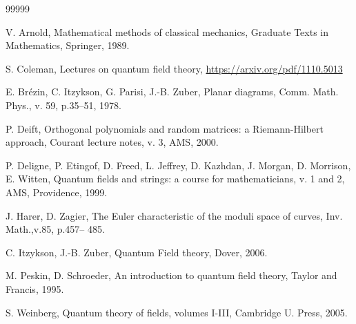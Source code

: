 \renewcommand{\refname}{参考文献}

\begin{thebibliography}{99999}

 V.  Arnold, Mathematical methods of classical mechanics, 
Graduate Texts in Mathematics, Springer, 1989. 

 S. Coleman, Lectures on quantum field theory, 
\url{https://arxiv.org/pdf/1110.5013}

 E. Br\'ezin, C. Itzykson, G. Parisi, J.-B. Zuber, 
Planar diagrams, Comm. Math. Phys., v. 59, p.35--51, 1978. 

 P. Deift, Orthogonal polynomials and random matrices: a Riemann-Hilbert approach, Courant lecture notes, v. 3, AMS, 2000. 

 P. Deligne, P. Etingof, D. Freed, L. Jeffrey, D. Kazhdan, J. Morgan, D. Morrison, E. Witten, Quantum fields and strings: a course for mathematicians, v. 1 and 2, AMS, Providence, 1999. 

 J. Harer, D. Zagier, The Euler characteristic of the moduli space of curves, Inv. Math.,v.85, p.457-- 485. 

 C. Itzykson, J.-B. Zuber, Quantum Field theory, 
Dover, 2006.

 M. Peskin, D. Schroeder, An introduction to quantum field theory, Taylor and Francis, 1995. 

 S. Weinberg, Quantum theory of fields, volumes I-III, Cambridge U. Press, 2005. 

\end{thebibliography}
